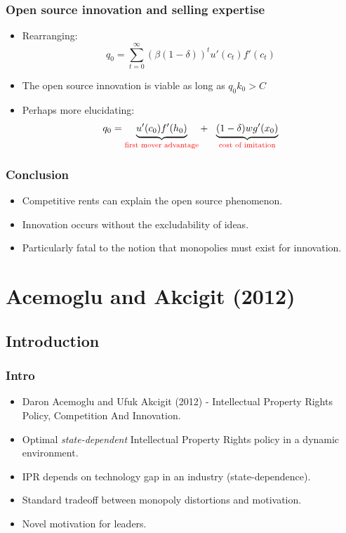 \documentclass{beamer}
\begin{document}
\begin{frame}[t]\frametitle{Open source innovation and selling expertise}
  \begin{itemize}
    \item<+-> Rearranging:
    \begin{equation*}
       q_0 = \sum_{t=0}^\infty(\beta(1-\delta))^tu'(c_t)f'(c_t)
    \end{equation*}
     \item<+-> The open source innovation is viable as long as $q_0k_0 > C$
     \item<+-> Perhaps more elucidating:\\
	 \begin{equation*}
     q_0 = \underbrace{u'(c_0)f'(h_0)}_{\text{\color{red}first mover advantage}} +\ \ \underbrace{(1-\delta)wg'(x_0)}_{\text{\color{red}cost of imitation}} 
	 \end{equation*} 
  \end{itemize}
\end{frame}

\begin{frame}[t]\frametitle{Conclusion}
  \vspace{20mm}
  \begin{itemize}
    \item<+-> Competitive rents can explain the open source phenomenon.
	\item<+-> Innovation occurs without the excludability of ideas.
	\item<+-> Particularly fatal to the notion that monopolies must exist for innovation.
  \end{itemize}
\end{frame}

\section{Acemoglu and Akcigit (2012)}
\label{sec:acemoglu_and_akcigit_2012}

\subsection{Introduction}
\label{sub:introduction}

\begin{frame}[t]\frametitle{Intro}
  \begin{itemize}
    \item<+-> Daron Acemoglu and Ufuk Akcigit (2012) - Intellectual Property Rights Policy, Competition And Innovation.
    \item<+-> Optimal \emph{state-dependent} Intellectual Property Rights policy in a dynamic environment.
    \item<+-> IPR depends on technology gap in an industry (state-dependence).
    \item<+-> Standard tradeoff between monopoly distortions and motivation.
    \item<+-> Novel motivation for leaders.
  \end{itemize}
\end{frame}
\end{document}
